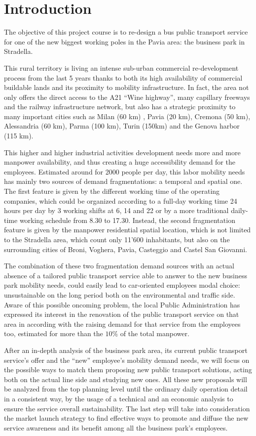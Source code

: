 \chapter{Introduction}
The objective of this project course is to re-design a bus public transport service for one of the new biggest working poles in the Pavia area: the business park in Stradella.

This rural territory is living an intense sub-urban commercial re-development process from the last 5 years thanks to both its high availability of commercial buildable lands and its proximity to mobility infrastructure. In fact, the area not only offers the direct access to the A21 “Wine highway”, many capillary freeways and the railway infrastructure network, but also has a strategic proximity to many important cities such as Milan (60 km) ,  Pavia (20 km), Cremona (50 km),  Alessandria (60 km), Parma (100 km), Turin (150km) and the Genova harbor (115 km).

This higher and higher industrial activities development needs more and more manpower availability, and thus creating a huge accessibility demand for the employees. Estimated around for 2000 people per day, this labor mobility needs has mainly two sources of demand fragmentations: a temporal and spatial one. The first feature is given by the different working time of the operating companies, which could be organized according to a full-day working time 24 hours per day by 3 working shifts at 6, 14 and 22 or by a more traditional daily-time working schedule from 8.30 to 17.30.  Instead, the second fragmentation feature is given by the manpower residential spatial location, which is not limited to the Stradella area, which count only 11’600 inhabitants, but also on the surrounding cities of Broni, Voghera, Pavia, Casteggio and Castel San Giovanni.

The combination of these two fragmentation demand sources with an actual absence of a tailored public transport service able to answer to the new business park mobility needs, could easily lead to car-oriented employees modal choice: unsustainable on the long period both on the environmental and traffic side. Aware of this possible oncoming problem, the local Public Administration has expressed its interest in the renovation of the public transport service on that area in according with the raising demand for that service from the employees too, estimated for more than the $10\%$ of the total manpower.

After an in-depth analysis of the business park area, its current public transport service’s offer and the “new” employee’s mobility demand needs, we will focus on the possible ways to match them proposing new public transport solutions, acting both on the actual line side and studying new ones. All these new proposals will be analyzed from the top planning level until the ordinary daily operation detail in a consistent way, by the usage of a technical and an economic analysis to ensure the service overall sustainability. The last step will take into consideration the market launch strategy to find effective ways to promote and diffuse the new service awareness and its benefit among all the business park’s employees. 

